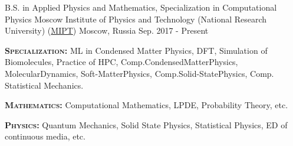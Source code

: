 

\begin{cventries}

  \cventry
    {B.S. in Applied Physics and Mathematics, Specialization in Computational Physics} %
    {Moscow Institute of Physics and Technology (National Research University) (\href{https://mipt.ru/english/}{MIPT})} %
    {Moscow, Russia} %
    {Sep. 2017 - Present} %
    {
      \begin{cvitems} %
        \item {\textsc{\textbf{Specialization:}} \hspace{5pt} \textsf{ML in Condensed Matter Physics}, \hspace{10pt} \textsf{DFT}, \hspace{10pt} \textsf{Simulation of Biomolecules}, \hspace{10pt} \textsf{Practice of HPC}, \newline Comp.\hspace{2pt}Condensed\hspace{2pt}Matter\hspace{2pt}Physics, \hspace{4pt} Molecular\hspace{2pt}Dynamics, \hspace{4pt} Soft-Matter\hspace{2pt}Physics, \hspace{4pt} Comp.\hspace{2pt}Solid-State\hspace{2pt}Physics, \hspace{4pt} Comp. Statistical Mechanics.}
        \item {\textsc{\textbf{Mathematics:}} \hspace{5pt} Computational Mathematics, \hspace{10pt} LPDE, \hspace{10pt} Probability Theory, \hspace{10pt} etc.}
        \item {\textsc{\textbf{Physics:}} \hspace{5pt} Quantum Mechanics, \hspace{10pt} Solid State Physics, \hspace{10pt} Statistical Physics, \hspace{10pt} ED of continuous media, etc.}

\end{cvitems}}
\end{cventries}
